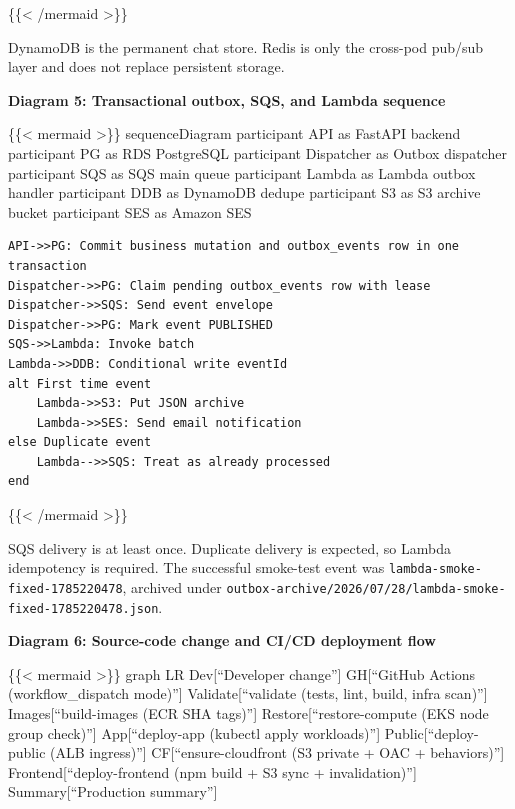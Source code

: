 \{\{\textless{} /mermaid \textgreater\}\}

DynamoDB is the permanent chat store. Redis is only the cross-pod
pub/sub layer and does not replace persistent storage.

\vspace{0.5em}\noindent\textbf{Diagram 5: Transactional outbox, SQS, and Lambda
sequence}\par

\{\{\textless{} mermaid \textgreater\}\} sequenceDiagram participant API
as FastAPI backend participant PG as RDS PostgreSQL participant
Dispatcher as Outbox dispatcher participant SQS as SQS main queue
participant Lambda as Lambda outbox handler participant DDB as DynamoDB
dedupe participant S3 as S3 archive bucket participant SES as Amazon SES

\begin{verbatim}
API->>PG: Commit business mutation and outbox_events row in one transaction
Dispatcher->>PG: Claim pending outbox_events row with lease
Dispatcher->>SQS: Send event envelope
Dispatcher->>PG: Mark event PUBLISHED
SQS->>Lambda: Invoke batch
Lambda->>DDB: Conditional write eventId
alt First time event
    Lambda->>S3: Put JSON archive
    Lambda->>SES: Send email notification
else Duplicate event
    Lambda-->>SQS: Treat as already processed
end
\end{verbatim}

\{\{\textless{} /mermaid \textgreater\}\}

SQS delivery is at least once. Duplicate delivery is expected, so Lambda
idempotency is required. The successful smoke-test event was
\texttt{lambda-\allowbreak{}smoke-\allowbreak{}fixed-\allowbreak{}1785220478}, archived under
\texttt{outbox-\allowbreak{}archive/\allowbreak{}2026/\allowbreak{}07/\allowbreak{}28/\allowbreak{}lambda-\allowbreak{}smoke-\allowbreak{}fixed-\allowbreak{}1785220478.\allowbreak{}json}.

\vspace{0.5em}\noindent\textbf{Diagram 6: Source-code change and CI/CD deployment
flow}\par

\{\{\textless{} mermaid \textgreater\}\} graph LR Dev{[}``Developer
change''{]} GH{[}``GitHub Actions (workflow\_dispatch mode)''{]}
Validate{[}``validate (tests, lint, build, infra scan)''{]}
Images{[}``build-images (ECR SHA tags)''{]} Restore{[}``restore-compute
(EKS node group check)''{]} App{[}``deploy-app (kubectl apply
workloads)''{]} Public{[}``deploy-public (ALB ingress)''{]}
CF{[}``ensure-cloudfront (S3 private + OAC + behaviors)''{]}
Frontend{[}``deploy-frontend (npm build + S3 sync + invalidation)''{]}
Summary{[}``Production summary''{]}

